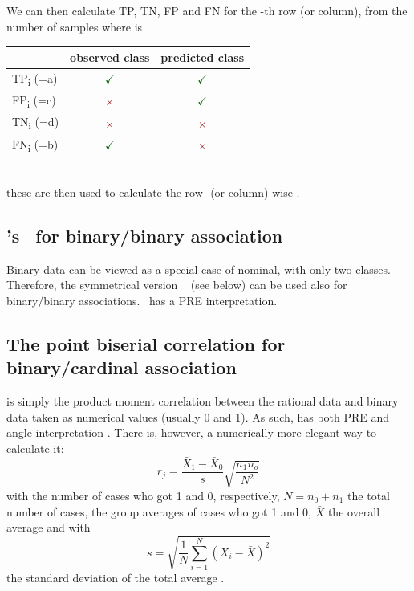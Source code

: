 \begin{refsection}
We can then calculate TP, TN, FP and FN for the -th row (or column), from the number of samples where  is\\
\begin{tabular}{|l|cc|}
  \toprule
                      & observed class & predicted class \\
  \midrule
  TP\textsubscript{i} (=a) & \textcolor{DarkGreen}{\(\checkmark\)} & \textcolor{DarkGreen}{\(\checkmark\)} \\
  FP\textsubscript{i} (=c) & \textcolor{DarkRed}{\(\times\)}       & \textcolor{DarkGreen}{\(\checkmark\)} \\
  TN\textsubscript{i} (=d) & \textcolor{DarkRed}{\(\times\)}       & \textcolor{DarkRed}{\(\times\)}       \\
  FN\textsubscript{i} (=b) & \textcolor{DarkGreen}{\(\checkmark\)} & \textcolor{DarkRed}{\(\times\)}       \\
  \bottomrule
\end{tabular}\\
these are then used to calculate the row- (or column)-wise .

\subsection{'s \textlambda\ for binary/binary association}

Binary data can be viewed as a special case of nominal, with only two classes. Therefore, the symmetrical version \textlambda\ \parencite{Goo-54} (see below) can be used also for binary/binary associations. \textlambda\ has a PRE interpretation.

\subsection{The point biserial correlation  for binary/cardinal association}

 is simply the product moment correlation between the rational data and binary data taken as numerical values (usually 0 and 1). As such,  has both PRE and angle interpretation \parencite{Cos-65}. There is, however, a numerically more elegant way to calculate it:
\begin{equation}
  r_j = \frac{\bar{X}_1 - \bar{X}_0}{s} \sqrt{\frac{n_1 n_o}{N^2}}
\end{equation}
with  the number of cases who got 1 and 0, respectively, \(N = n_0 + n_1 \) the total number of cases,  the group averages of cases who got 1 and 0, \(\bar X \) the overall average and with
\begin{equation}
  s = \sqrt{\frac{1}{N} \sum\limits_{i=1}^N (X_i - \bar{X})^2}
\end{equation}
the standard deviation of the total average .


\end{refsection}
